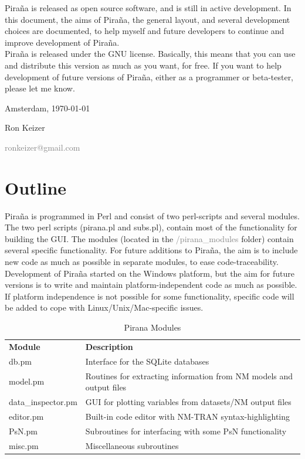 \documentclass[a4,11pt]{report}
\begin{document}
\noindent Pira\~na is released as open source software, and is still
in active development. In this document, the aims of Pira\~na, the
general layout, and several development choices are documented, to
help myself and future developers to continue and improve development
of Pira\~na. \\


\noindent Pira\~na is released under the GNU license. Basically, this
means that you can use and distribute this version as much as you
want, for free. If you want to help development of future versions of
Pira\~na, either as a programmer or beta-tester, please let me
know. \\

\vspace{10pt}

Amsterdam, \today

Ron Keizer

\scriptsize{\textcolor{Grey}{ronkeizer@gmail.com}} \normalsize

\pagebreak


\section{Outline} Pira\~na is programmed in Perl and consist of two
perl-scripts and several modules. The two perl scripts (pirana.pl and
subs.pl), contain most of the functionality for building the GUI. The
modules (located in the \textcolor{Grey}{/pirana\_modules} folder)
contain several specific functionality. For future additions to
Pira\~na, the aim is to include new code as much as possible in
separate modules, to ease code-traceability.\\

\noindent Development of Pira\~na started on the Windows platform, but
the aim for future versions is to write and maintain
platform-independent code as much as possible. If platform
independence is not possible for some functionality, specific code
will be added to cope with Linux/Unix/Mac-specific issues.\\

\begin{table}[h] \centering {}
\begin{tabular}{ll} \textbf{Module} & \textbf{Description} \\
\small {db.pm} & \small {Interface for the SQLite databases} \\
\small {model.pm} & \small {Routines for extracting information from NM models and output files} \\
 \small {data\_inspector.pm} & \small {GUI for plotting variables from datasets/NM output files} \\
\small {editor.pm} & \small {Built-in code editor with NM-TRAN syntax-highlighting} \\
\small {PsN.pm} & \small {Subroutines for interfacing with some PsN functionality} \\
 \small {misc.pm} & \small {Miscellaneous subroutines} \\
	\end{tabular}
	\caption{Pirana Modules}
	\label{tab:PiranaModules}
\end{table}
\end{document}
